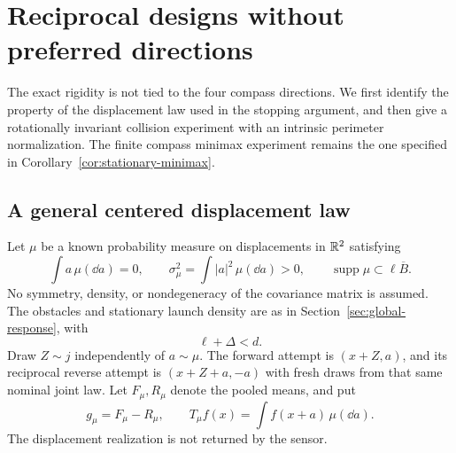 \section{Reciprocal designs without preferred directions}
\label{sec:isotropic-rigidity}
The exact rigidity is not tied to the four compass directions. We
first identify the property of the displacement law used in the
stopping argument, and then give a rotationally invariant collision
experiment with an intrinsic perimeter normalization. The finite
compass minimax experiment remains the one specified in
Corollary~\ref{cor:stationary-minimax}.

\subsection{A general centered displacement law}
Let $\mu$ be a known probability measure on displacements in $\mathbb R^2$
satisfying
\begin{equation}\label{eq:general-command-law}
 \int a\,\mu(\dd a)=0,\qquad
 \sigma_\mu^2=\int|a|^2\,\mu(\dd a)>0,\qquad
 \operatorname{supp}\mu\subset\ell\overline B.
\end{equation}
No symmetry, density, or nondegeneracy of the covariance matrix is
assumed. The obstacles and stationary launch density are as in
Section~\ref{sec:global-response}, with
\begin{equation}\label{eq:general-command-separation}
                              \ell+\Delta<d.
\end{equation}
Draw $Z\sim j$ independently of $a\sim\mu$. The forward attempt
is $(x+Z,a)$, and its reciprocal reverse attempt is
$(x+Z+a,-a)$ with fresh draws from that same nominal joint law.
Let $F_\mu,R_\mu$ denote the pooled means, and put
\[
 g_\mu=F_\mu-R_\mu,\qquad
 T_\mu f(x)=\int f(x+a)\,\mu(\dd a).
\]
The displacement realization is not returned by the sensor.


